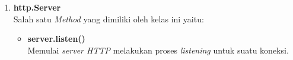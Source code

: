 \begin{enumerate}
	\item \textbf{http.Server} \\ 
%		
%	
%		
%		
%	
	Salah satu \textit{Method} yang dimiliki oleh kelas ini yaitu:
	\begin{itemize}
		\item \textbf{server.listen()} \\ Memulai \textit{server HTTP} melakukan proses \textit{listening} untuk suatu koneksi.
	\end{itemize}
%		
%		
%		
\end{enumerate} 

